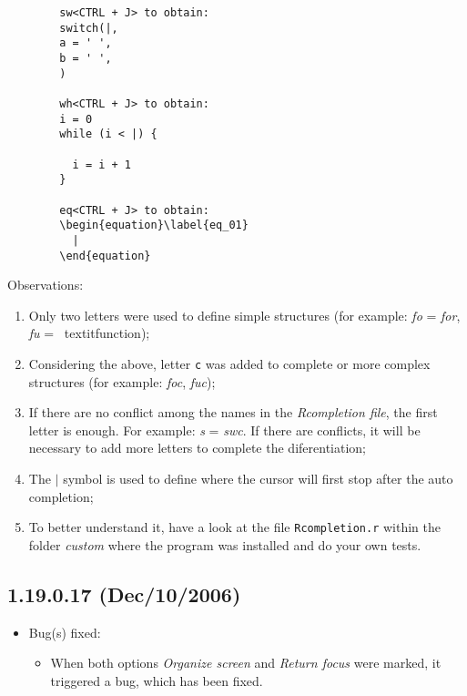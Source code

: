 \begin{itemize}
\begin{footnotesize}
\begin{verbatim}
        sw<CTRL + J> to obtain:
        switch(|,
        a = ' ',
        b = ' ',
        )

        wh<CTRL + J> to obtain:
        i = 0
        while (i < |) {

          i = i + 1
        }

        eq<CTRL + J> to obtain:
        \begin{equation}\label{eq_01}
          |
        \end{equation}
      \end{verbatim}
    \end{footnotesize}

    Observations:

    \begin{enumerate}
      \item Only two letters were used to define simple structures
        (for example: \textit{fo} = \textit{for}, \textit{fu} = \
        textit{function});
      \item Considering the above, letter \texttt{c} was added
        to complete or more complex structures (for example:
        \textit{foc}, \textit{fuc});
      \item If there are no conflict among the names in the
        \textit{Rcompletion file}, the first letter is enough. For
        example: \textit{s} = \textit{swc}. If there are conflicts, it
        will be necessary to add more letters to complete the diferentiation;
      \item The \texttt{$|$} symbol is used to define where the cursor
        will first stop after the auto completion;
      \item To better understand it, have a look at the file
        \texttt{Rcompletion.r} within the folder \textit{custom}
        where the program was installed and do your own tests.
    \end{enumerate}
\end{itemize}


\subsection*{1.19.0.17 (Dec/10/2006)}
\begin{itemize}
  \item Bug(s) fixed:
    \begin{itemize}
      \item When both options \textit{Organize screen} and
        \textit{Return focus} were marked, it triggered a bug,
        which has been fixed.
    \end{itemize}
\end{itemize}


